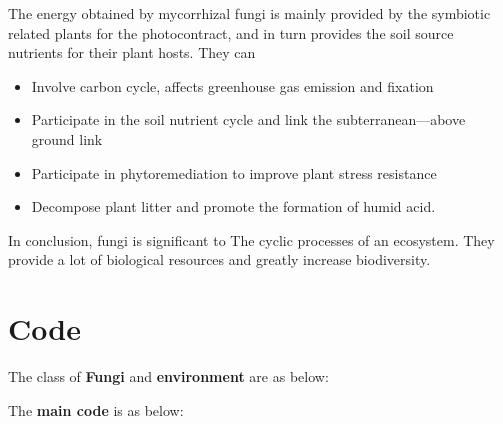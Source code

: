 \documentclass{mcmthesis}
\begin{document}
\begin{appendices}
The energy obtained by mycorrhizal fungi is mainly provided by the symbiotic related plants for the photocontract, and in turn provides the soil source nutrients for their plant hosts. 
They can
\begin{itemize}
  \item Involve carbon cycle, affects greenhouse gas emission and fixation
  \item Participate in the soil nutrient cycle and link the subterranean---above ground link
  \item Participate in phytoremediation to improve plant stress resistance
  \item Decompose plant litter and promote the formation of humid acid.
\end{itemize} 

In conclusion, fungi is significant to The cyclic processes of an ecosystem. 
They provide a lot of biological resources and greatly increase biodiversity.



\newpage
\section{Code}

% 
The class of \textcolor[rgb]{0.98,0,0}{\textbf{Fungi}} and \textcolor[rgb]{0.98,0,0}{\textbf{environment}} are as below:


The \textcolor[rgb]{0.98,0,0}{\textbf{main code}} is as below:


\end{appendices}
\end{document}
